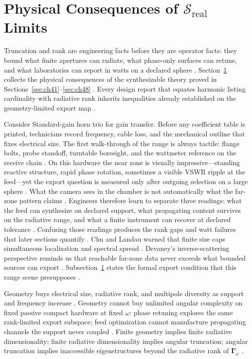\section{Physical Consequences of $\mathcal{S}_{\mathrm{real}}$ Limits}
\label{sec:ch49}
Truncation and rank are engineering facts before they are operator facts: they bound what finite apertures can radiate, what phase-only surfaces can retune, and what laboratories can report in watts on a declared sphere \cite{stratton1941}. Section~\ref{sec:ch49} collects the physical consequences of the synthesizable theory proved in Sections~\ref{sec:ch41}--\ref{sec:ch48} \cite{hansen1988}. Every design report that equates harmonic listing cardinality with radiative rank inherits inequalities already established on the geometry-limited export map \cite{stratton1941}.
\begin{physicalvignette}
Consider Standard-gain horn trio for gain transfer. Before any coefficient table is printed, technicians record frequency, cable loss, and the mechanical outline that fixes electrical size. The first walk-through of the range is always tactile: flange bolts, probe standoff, turntable boresight, and the wattmeter reference on the receive chain \cite{hansen1988}.
On this hardware the near zone is visually impressive---standing reactive structure, rapid phase rotation, sometimes a visible VSWR ripple at the feed---yet the export question is measured only after outgoing selection on a large sphere \cite{harrington2001}. What the camera sees in the chamber is not automatically what the far-zone pattern claims \cite{stratton1941}.
Engineers therefore learn to separate three readings: what the feed can synthesize on declared support, what propagating content survives on the radiative range, and what a finite instrument can recover at declared tolerance \cite{devaney2004}. Confusing those readings produces the rank gaps and watt failures that later sections quantify \cite{pal2026}.
Chu and Landau warned that finite size caps simultaneous localization and spectral spread \cite{chu1948}. Devaney's inverse-scattering perspective reminds us that reachable far-zone data never exceeds what bounded sources can export \cite{devaney2004}.
Subsection~\ref{sec:ch49} states the formal export condition that this range scene presupposes \cite{stratton1941}.
\end{physicalvignette}
Geometry buys electrical size, radiative rank, and multipole diversity as support and frequency increase \cite{stratton1941}. Geometry cannot buy unlimited angular complexity on fixed passive compact hardware at fixed $\omega$: phase retuning explores the same rank-limited export subspace; feed optimization cannot manufacture propagating channels the support never coupled \cite{devaney2004}.
Finite geometry implies finite radiative dimensionality; finite radiative dimensionality implies angular truncation; angular truncation implies inaccessible eigenstructures beyond the radiative rank of $\boldsymbol{\Gamma}_\omega$ \cite{chu1948}.

